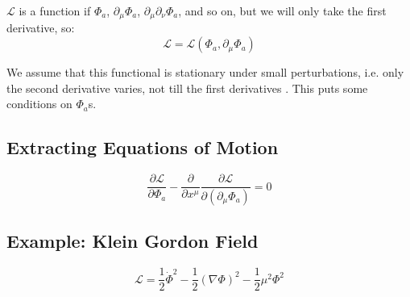 $\mathcal{L}$ is a function if $\Phi_a$, $\partial_\mu \Phi_a$, $\partial_\mu \partial_\nu \Phi_a$, and so on, but we will only take the first derivative, so:
\begin{equation}
  \mathcal{L} = \mathcal{L}(\Phi_a, \partial_\mu \Phi_a)
\end{equation}

We assume that this functional is stationary under small perturbations, i.e. only the second derivative varies, not till the first derivatives \danger. This puts some conditions on $\Phi_a$s.


\subsection{Extracting Equations of Motion}

\begin{equation}
  \frac{\partial \mathcal{L}}{\partial \Phi_a} - \frac{\partial}{\partial x^\mu} \frac{\partial \mathcal{L}}{\partial (\partial_\mu \Phi_a)} = 0
\end{equation}


\subsection{Example: Klein Gordon Field}

\begin{equation}
  \mathcal{L} = \frac{1}{2} \dot{\Phi}^2 - \frac{1}{2} (\nabla \Phi)^2 - \frac{1}{2} \mu^2 \Phi^2
\end{equation}
